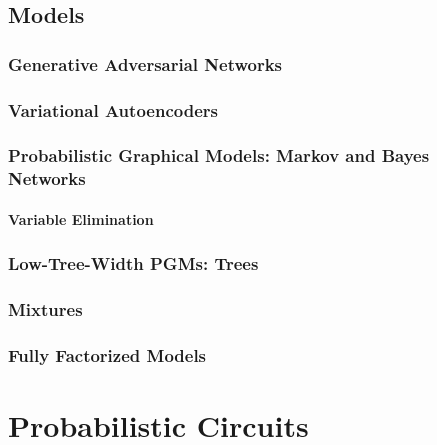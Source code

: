 		\subsection{Models} %

			\subsubsection{Generative Adversarial Networks} %

			\subsubsection{Variational Autoencoders} %

			\subsubsection{Probabilistic Graphical Models: Markov and Bayes Networks} %

				\paragraph{Variable Elimination} %

			\subsubsection{Low-Tree-Width PGMs: Trees} %

			\subsubsection{Mixtures} %

			\subsubsection{Fully Factorized Models} %

	\section{Probabilistic Circuits} %

